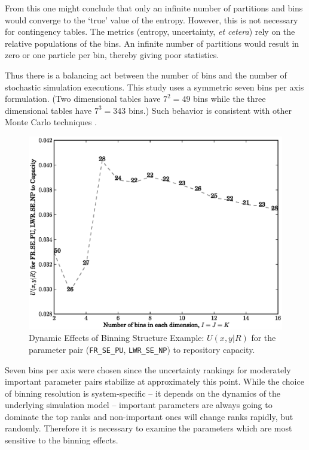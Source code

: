 \documentclass[preprint,12pt]{elsarticle}
\begin{document}
From this one might conclude that only an infinite number of partitions and bins would converge 
to the `true' value of the entropy.  However, this is not necessary for contingency tables.  
The metrics (entropy, uncertainty, \emph{et cetera}) rely on the relative populations of the bins.
An infinite number of partitions would result in zero or one particle per bin, 
thereby giving poor statistics.

Thus there is a balancing act between the number of bins and the number of stochastic simulation executions.  This study uses a symmetric seven bins per axis formulation.  (Two dimensional tables have $7^2=49$ bins while the three dimensional tables have
$7^3=343$ bins.)
Such behavior is consistent with other Monte Carlo techniques \cite{Press2007}.

\begin{figure}[htbp]
\begin{center}
\includegraphics[scale=0.70]{U_xy_R_for_FR_SE_PU_and_LWR_SE_NP_to_Capacity_rank.eps}
\caption{Dynamic Effects of Binning Structure Example: $U(x,y|R)$ for the parameter pair (\texttt{FR\_SE\_PU}, \texttt{LWR\_SE\_NP}) to repository capacity.}
\label{dynamic_effects}
\end{center}
\end{figure}

Seven bins per axis were chosen since the uncertainty rankings for moderately important parameter pairs stabilize at approximately this point.  While the choice of binning resolution is system-specific -- it depends on the dynamics of the underlying simulation model -- important parameters are always going to dominate the top ranks and non-important ones will change ranks rapidly, but randomly.  Therefore it is necessary  to
examine the parameters which are most sensitive to the binning effects.
\end{document}
